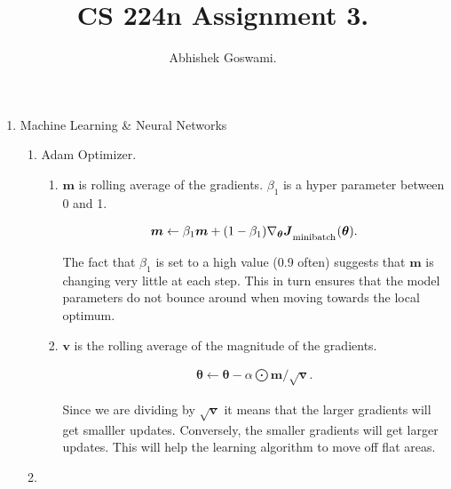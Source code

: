 \documentclass[]{article}
\begin{document}
\title{CS 224n Assignment 3.}
\author{Abhishek Goswami.}
\maketitle

\begin{enumerate}
	\item Machine Learning \& Neural Networks
	
	\begin{enumerate}
		
		\item
		
		Adam Optimizer.
		
		\begin{enumerate}
				
			\item
			
			$\boldsymbol{m}$ is rolling average of the gradients. $\beta_1$ is a hyper parameter between 0 and 1. 
			
		\begin{align}
		\boldsymbol{m} \leftarrow \beta_{1} \boldsymbol{m} + (1 - \beta_{1}) \nabla_{\boldsymbol{\theta}} \boldsymbol{J}_\textsubscript{minibatch}(\boldsymbol{\theta}).
		\end{align}
		
			The fact that $\beta_1$ is set to a high value (0.9 often) suggests that $\boldsymbol{m}$ is changing very little at each step.  This in turn ensures that the  model parameters  do not bounce around when moving towards the local optimum.
			\item
			$\boldsymbol{v}$ is the rolling average of the magnitude of the gradients. 
			
		\begin{align}
		\boldsymbol{\theta} \leftarrow \boldsymbol{\theta} - \alpha \bigodot \boldsymbol{m} / \sqrt{\boldsymbol{v}}.
		\end{align}
			
			Since we are dividing by $\sqrt{\boldsymbol{v}}$ it means that the larger  gradients will get smalller updates.   Conversely,  the smaller gradients will get larger updates.  This will help the learning algorithm to move off flat areas.
			
		\end{enumerate}
		
		\item
		

\end{enumerate}
\end{enumerate}
\end{document}
